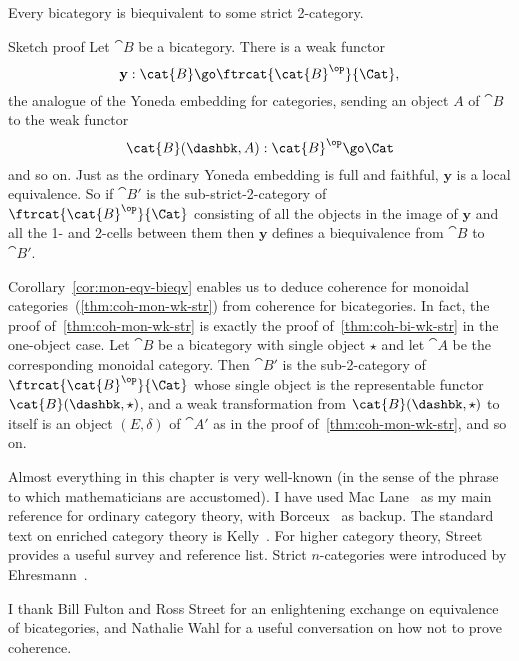 \begin{thm}	
Every bicategory is biequivalent to some strict 2-category.
\end{thm}
%
\begin{prooflike}{Sketch proof}
Let $\cat{B}$ be a bicategory.  There is a weak functor
\[
\mathbf{y}: \cat{B} \go \ftrcat{\cat{B}^\op}{\Cat},
\]
the analogue of the Yoneda%
%
%
embedding for categories, sending an object $A$
of $\cat{B}$ to the weak functor
\[
\cat{B}(\dashbk, A): \cat{B}^\op \go \Cat
\]
and so on.  Just as the ordinary Yoneda embedding is full and faithful,
$\mathbf{y}$ is a local equivalence.  So if $\cat{B'}$ is the
sub-strict-2-category of $\ftrcat{\cat{B}^\op}{\Cat}$ consisting of all the
objects in the image of $\mathbf{y}$ and all the 1- and 2-cells between
them then $\mathbf{y}$ defines a biequivalence from $\cat{B}$ to
$\cat{B'}$.  
\done
\end{prooflike}

\begin{example}	%
%
%
Corollary~\ref{cor:mon-eqv-bieqv} enables us to deduce coherence for
monoidal categories~(\ref{thm:coh-mon-wk-str}) from coherence for
bicategories.  In fact, the proof of~\ref{thm:coh-mon-wk-str} is exactly
the proof of~\ref{thm:coh-bi-wk-str} in the one-object case.  Let $\cat{B}$
be a bicategory with single object $\star$ and let $\cat{A}$ be the
corresponding monoidal category.  Then $\cat{B'}$ is the sub-2-category of
$\ftrcat{\cat{B}^\op}{\Cat}$ whose single object is the representable
functor $\cat{B}(\dashbk, \star)$, and a weak transformation from
$\cat{B}(\dashbk, \star)$ to itself is an object $(E, \delta)$ of
$\cat{A'}$ as in the proof of~\ref{thm:coh-mon-wk-str}, and so on.
\end{example}%
%
%
%




\begin{notes}

Almost everything in this chapter is very well-known (in the sense of the
phrase to which mathematicians are accustomed).  I have used Mac
Lane~\cite{MacCWM} as my main reference for ordinary category theory, with
Borceux~\cite{Borx1, Borx2} as backup.  The standard text on enriched
category theory is Kelly~\cite{KelBCE}.  For higher category theory,
Street~\cite{StrCS} provides a useful survey and reference list.  Strict
$n$-categories were introduced by Ehresmann~\cite{Ehr}.%
%
%

I thank Bill Fulton and Ross Street for an enlightening exchange on
equivalence of bicategories, and Nathalie Wahl for a useful conversation on
how not%
%
%
to prove coherence.

\end{notes}

